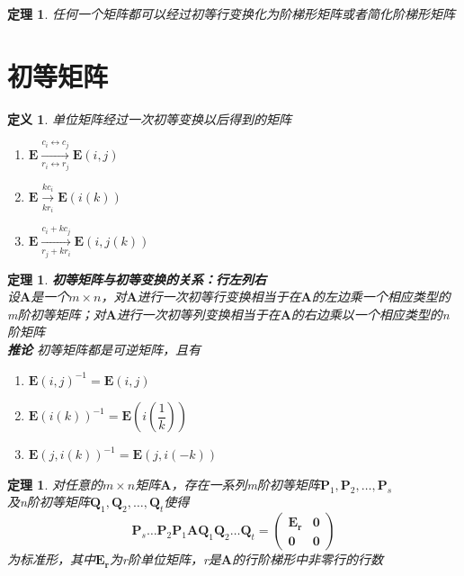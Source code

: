 \documentclass[12pt,oneside]{ctexbook}
\newtheorem{definition}[subsection]{定义}
\newtheorem{theorem}[subsection]{定理}
\begin{document}
\begin{theorem}
    任何一个矩阵都可以经过初等行变换化为阶梯形矩阵或者简化阶梯形矩阵
\end{theorem}

\section{初等矩阵}
\begin{definition}
单位矩阵经过一次初等变换以后得到的矩阵
\begin{enumerate}
    \item \(\mathbf{E}\xrightarrow[r_i\leftrightarrow r_j]{c_i\leftrightarrow c_j}\mathbf{E}(i,j)\)
    \item \(\mathbf{E}\xrightarrow[kr_i]{kc_i}\mathbf{E}(i(k))\)
    \item \(\mathbf{E}\xrightarrow[r_j+kr_i]{c_i+kc_j}\mathbf{E}(i,j(k))\)
\end{enumerate}
\end{definition}

\begin{theorem}
    \textbf{初等矩阵与初等变换的关系：行左列右}
    \\设\(\mathbf{A}\)是一个\(m \times n\)，对\(\mathbf{A}\)进行一次初等行变换相当于在\(\mathbf{A}\)的左边乘一个相应类型的m阶初等矩阵；对\(\mathbf{A}\)进行一次初等列变换相当于在\(\mathbf{A}\)的右边乘以一个相应类型的n阶矩阵
    \\ \textbf{推论}
    初等矩阵都是可逆矩阵，且有
    \begin{enumerate}
        \item \(\mathbf{E}(i,j)^{-1}=\mathbf{E}(i,j)\)
        \item \(\mathbf{E}(i(k))^{-1}=\mathbf{E}(i(\dfrac{1}{k}))\)
        \item \(\mathbf{E}(j,i(k))^{-1}=\mathbf{E}(j,i(-k))\)
    \end{enumerate}
\end{theorem}

\begin{theorem}
    对任意的\(m\times n\)矩阵\(\mathbf{A}\)，存在一系列m阶初等矩阵\(\mathbf{P}_1,\mathbf{P}_2,\dots,\mathbf{P}_s\)
    \\及n阶初等矩阵\(\mathbf{Q}_1,\mathbf{Q}_2,\dots,\mathbf{Q}_t\)使得
    \[\mathbf{P}_s\dots \mathbf{P}_2\mathbf{P}_1\mathbf{A}\mathbf{Q}_1\mathbf{Q}_2\dots\mathbf{Q}_t
    =\begin{pmatrix}
        \mathbf{E_r}&\mathbf{0}
        \\ \mathbf{0}&\mathbf{0}
    \end{pmatrix}\]
    为标准形，其中\(\mathbf{E_r}\)为r阶单位矩阵，r是\(\mathbf{A}\)的行阶梯形中非零行的行数
\end{theorem}
\end{document}
